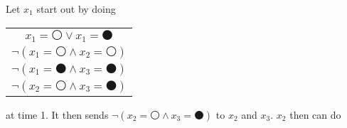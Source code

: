 Let $x_1$ start out by doing
\begin{center}
\begin{tabular}{c}
  \phantom{$\neg ($}$x_1 = \medcirc \vee x_1 = \medbullet$\phantom{$)$} \\
  $\neg(x_1 = \medcirc \wedge x_2 = \medcirc)$ \\
  $\neg(x_1 = \medbullet \wedge x_3 = \medbullet)$ \\ \midrule
  $\neg(x_2 = \medcirc \wedge x_3 = \medbullet)$
\end{tabular}
\end{center}
at time 1. It then sends $\neg(x_2 = \medcirc \wedge x_3 =
\medbullet)$ to $x_2$ and $x_3$. $x_2$ then can do

